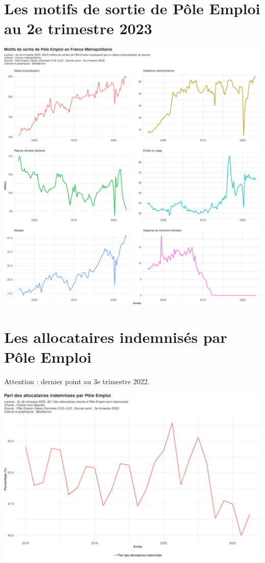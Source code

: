 \documentclass[
  paper=a4,
  ,captions=tableheading
]{scrartcl}
\begin{document}
\hypertarget{les-motifs-de-sortie-de-puxf4le-emploi-au-2e-trimestre-2023}{%
\section{Les motifs de sortie de Pôle Emploi au 2e trimestre
2023}\label{les-motifs-de-sortie-de-puxf4le-emploi-au-2e-trimestre-2023}}

\includegraphics{rapport_pdf_demandeurs_emploi_pole_emploi_files/figure-latex/unnamed-chunk-17-1.pdf}

\newpage

\hypertarget{les-allocataires-indemnisuxe9s-par-puxf4le-emploi}{%
\section{Les allocataires indemnisés par Pôle
Emploi}\label{les-allocataires-indemnisuxe9s-par-puxf4le-emploi}}

Attention : dernier point au 3e trimestre 2022.

\includegraphics{rapport_pdf_demandeurs_emploi_pole_emploi_files/figure-latex/unnamed-chunk-19-1.pdf}
\end{document}
